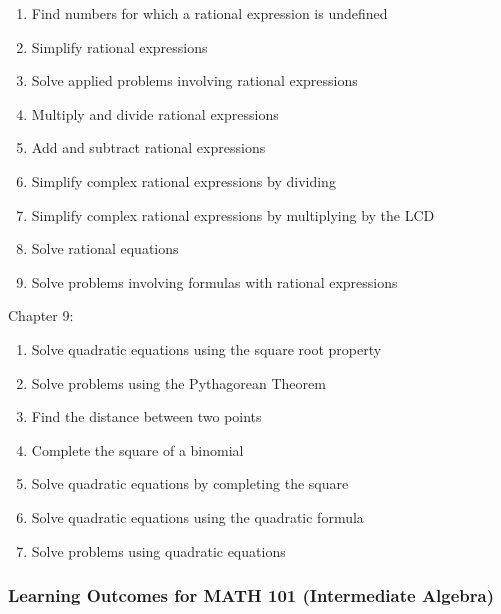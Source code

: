 \documentclass[11pt]{article}
\newenvironment{alphalist}{
  \begin{enumerate}[(1)]
    \addtolength{\itemsep}{-1.0\itemsep}}
  {\end{enumerate}}
\begin{document}
 \begin{alphalist}
    \item Find numbers for which a rational expression is undefined
    \item Simplify rational expressions
    \item Solve applied problems involving rational expressions
    \item Multiply and divide rational expressions
    \item Add and subtract rational expressions
    \item Simplify complex rational expressions by dividing
    \item Simplify complex rational expressions by multiplying by the LCD
    \item Solve rational equations
    \item Solve problems involving formulas with rational expressions
 \end{alphalist}
\noindent Chapter 9:
 \begin{alphalist}
    \item Solve quadratic equations using the square root property
    \item Solve problems using the Pythagorean Theorem
    \item Find the distance between two points
    \item Complete the square of a binomial
    \item Solve quadratic equations by completing the square
    \item Solve quadratic equations using the quadratic formula
    \item Solve problems using quadratic equations
 \end{alphalist}

\subsubsection*{Learning Outcomes for MATH 101 (Intermediate Algebra)}
\end{document}
